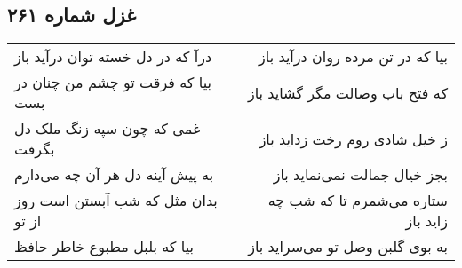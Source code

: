 \begin{center}
\section*{غزل شماره ۲۶۱}
\label{sec:sh261}
\begin{longtable}{l p{0.5cm} r}
درآ که در دل خسته توان درآید باز
&&
بیا که در تن مرده روان درآید باز
\\
بیا که فرقت تو چشم من چنان در بست
&&
که فتح باب وصالت مگر گشاید باز
\\
غمی که چون سپه زنگ ملک دل بگرفت
&&
ز خیل شادی روم رخت زداید باز
\\
به پیش آینه دل هر آن چه می‌دارم
&&
بجز خیال جمالت نمی‌نماید باز
\\
بدان مثل که شب آبستن است روز از تو
&&
ستاره می‌شمرم تا که شب چه زاید باز
\\
بیا که بلبل مطبوع خاطر حافظ
&&
به بوی گلبن وصل تو می‌سراید باز
\\
\end{longtable}
\end{center}
